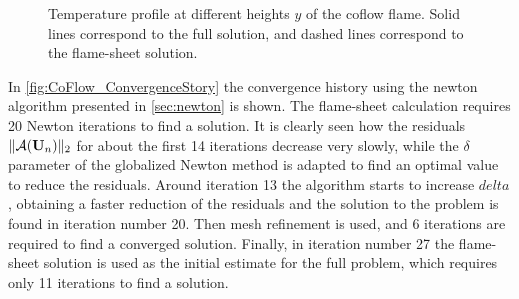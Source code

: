 \begin{figure}
		\centering
		\pgfplotsset{width=0.23\textwidth, compat=1.3} 
\caption{Temperature profile at different heights $y$ of the coflow flame. Solid lines correspond to the full solution, and dashed lines correspond to the flame-sheet solution.}
\end{figure}

In \cref{fig:CoFlow_ConvergenceStory} the convergence history using the newton algorithm presented in \cref{sec:newton} is shown. The flame-sheet calculation requires 20 Newton iterations to find a solution. It is clearly seen how the residuals $\| \mathcal{A}(\textbf{U}_{n}) \|_2 $  for about the first 14 iterations decrease very slowly, while the $\delta$ parameter of the globalized Newton method is adapted to find an optimal value to reduce the residuals. Around iteration 13 the algorithm starts to increase $delta$, obtaining a faster reduction of the residuals and the solution to the problem is found in iteration number 20. Then mesh refinement is used, and 6 iterations are required to find a converged solution. Finally, in iteration number 27 the flame-sheet solution is used as the initial estimate for the full problem, which requires only 11 iterations to find a solution. 

